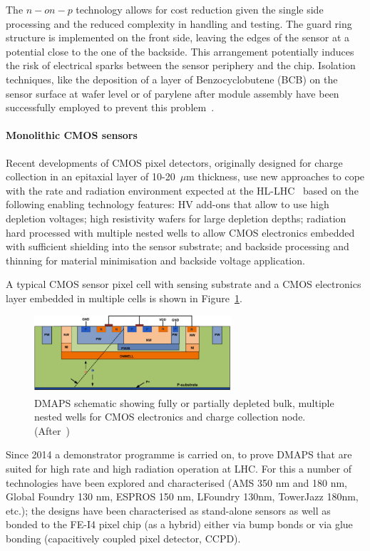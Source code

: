 The $n-on-p$ technology allows for cost reduction given the single side processing and the reduced 
complexity in handling and testing. The guard ring structure is implemented on the front side, leaving the 
edges of the sensor at a potential close to the one of the backside. This arrangement potentially induces the 
risk of electrical sparks between the sensor periphery and the chip. Isolation techniques, like the deposition 
of a layer of Benzocyclobutene (BCB) on the sensor surface at wafer level or of parylene after module 
	assembly have been successfully employed to prevent this problem~\cite{Stefano,UNNO201372}.

\paragraph{Monolithic CMOS sensors}
Recent developments of CMOS pixel detectors, originally designed for charge collection in an epitaxial layer 
of 10-20~$\mu$m thickness, use new approaches to cope with the rate and radiation environment expected 
at the HL-LHC~\cite{PERIC2007876,1748-0221-11-02-C02045,HEMPEREK20158} 
based on the following enabling technology features:
HV add-ons that allow to use high depletion voltages; high resistivity wafers for large depletion depths; 
radiation hard processed with multiple nested wells to allow CMOS electronics embedded with sufficient 
shielding into the sensor substrate; and backside processing and
thinning for material minimisation and backside voltage application.

A typical CMOS sensor pixel cell with sensing substrate and a CMOS electronics layer
embedded in multiple cells is shown in Figure~\ref{fig:DMAPS}.

\begin{figure}[!htbp]
   \centering
   \includegraphics[width=0.65\textwidth]{DMAPS.pdf} 
   \caption{\label{fig:DMAPS}DMAPS schematic showing fully or partially depleted bulk, multiple nested wells for CMOS electronics and charge collection node. (After~\cite{ITkStripsTDR})}
   \end{figure}

Since 2014 a demonstrator programme is carried on, to prove 
DMAPS that are suited for high rate and high radiation 
operation at LHC. For this a number of technologies have been explored and characterised 
(AMS 350 nm and 180 nm, Global Foundry 130 nm, ESPROS 150 nm, LFoundry 130nm, TowerJazz 
180nm, etc.); the designs have been characterised as stand-alone sensors as well as bonded to the FE-I4 
pixel chip (as a hybrid) either via bump bonds or via glue bonding (capacitively coupled pixel detector, 
CCPD).

